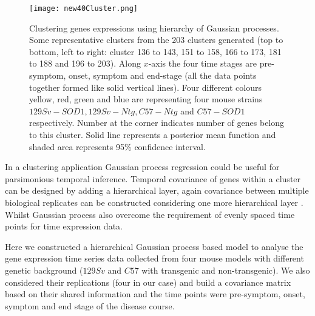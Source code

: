 \begin{figure}
 \begin{center}
 \texttt{[image: new40Cluster.png]}
\caption [Clustering genes expressions using hierarchy of Gaussian processes]
{Clustering genes expressions using hierarchy of Gaussian processes. 
Some representative clusters from the 203 clusters generated 
(top to bottom, left to right: cluster 136 to 143, 151 to 158, 166 to 173,
181 to 188 and 196 to 203). Along $x$-axis the four time stages are pre-symptom, onset, symptom and 
end-stage (all the data points together formed like solid vertical lines). 
Four different colours yellow, red, green and blue are representing four mouse strains 
$129Sv-SOD1, 129Sv-Ntg, C57-Ntg$ and $C57-SOD1$ respectively. Number at the corner indicates number 
of genes belong to this cluster. Solid line represents a posterior mean function and shaded area 
represents 95\% confidence interval.\label{fig:fewClusters}}
 \end{center}
\end{figure}

In a clustering application Gaussian process regression could be useful for parsimonious temporal 
inference. Temporal covariance of genes within a cluster can be designed by adding a hierarchical
layer, again covariance between multiple biological replicates can be constructed considering
one more hierarchical layer \cite{Hensman:2013}. Whilst Gaussian process also overcome the requirement of 
evenly spaced time points for time expression data.

Here we constructed a hierarchical Gaussian process \cite{Hensman:2013} based model to analyse the gene
expression time series data collected from four mouse models with different genetic background
($129Sv$ and $C57$ with transgenic and non-transgenic). We also considered their replications 
(four in our case) and build a covariance matrix based on their shared information and 
the time points were pre-symptom, onset, symptom and end stage of the disease course.


